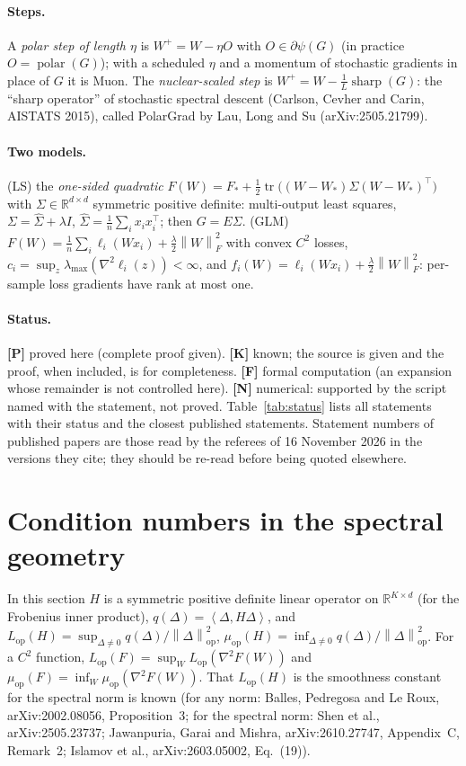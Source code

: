 \documentclass[11pt]{article}
\theoremstyle{definition}
\theoremstyle{remark}
\newcommand{\R}{\mathbb{R}}
\newcommand{\nop}[1]{\left\|#1\right\|_{\mathrm{op}}}
\newcommand{\nF}[1]{\left\|#1\right\|_{F}}
\newcommand{\inner}[2]{\left\langle #1, #2 \right\rangle}
\newcommand{\tr}{\operatorname{tr}}
\newcommand{\polar}{\operatorname{polar}}
\newcommand{\sharpop}{\operatorname{sharp}}
\newcommand{\Lop}{L_{\mathrm{op}}}
\newcommand{\muop}{\mu_{\mathrm{op}}}
\newcommand{\lmax}{\lambda_{\max}}
\begin{document}
\paragraph{Steps.} A \emph{polar step of length $\eta$} is $W^+=W-\eta O$ with $O\in\partial\psi(G)$ (in practice
$O=\polar(G)$); with a scheduled $\eta$ and a momentum of stochastic gradients in place of $G$ it is Muon. The
\emph{nuclear-scaled step} is $W^+=W-\frac{1}{L}\sharpop(G)$: the ``sharp operator'' of stochastic spectral descent
(Carlson, Cevher and Carin, AISTATS 2015), called PolarGrad by Lau, Long and Su (arXiv:2505.21799).

\paragraph{Two models.} (LS) the \emph{one-sided quadratic}
$F(W)=F_\ast+\frac12\tr\big((W-W_\ast)\Sigma(W-W_\ast)^\top\big)$ with $\Sigma\in\R^{d\times d}$ symmetric positive
definite: multi-output least squares, $\Sigma=\hat\Sigma+\lambda I$, $\hat\Sigma=\frac1n\sum_ix_ix_i^\top$; then
$G=E\Sigma$. (GLM) $F(W)=\frac1n\sum_i\ell_i(Wx_i)+\frac\lambda2\nF W^2$ with convex $C^2$ losses,
$c_i=\sup_z\lmax(\nabla^2\ell_i(z))<\infty$, and $f_i(W)=\ell_i(Wx_i)+\frac\lambda2\nF W^2$: per-sample loss gradients
have rank at most one.

\paragraph{Status.} \textbf{[P]} proved here (complete proof given). \textbf{[K]} known; the source is given and the
proof, when included, is for completeness. \textbf{[F]} formal computation (an expansion whose remainder is not
controlled here). \textbf{[N]} numerical: supported by the script named with the statement, not proved.
Table~\ref{tab:status} lists all statements with their status and the closest published statements. Statement numbers of
published papers are those read by the referees of 16 November 2026 in the versions they cite; they should be re-read
before being quoted elsewhere.

\section{Condition numbers in the spectral geometry}\label{sec:kappa}

In this section $H$ is a symmetric positive definite linear operator on $\R^{K\times d}$ (for the Frobenius inner
product), $q(\Delta)=\inner{\Delta}{H\Delta}$, and $\Lop(H)=\sup_{\Delta\ne0}q(\Delta)/\nop\Delta^2$,
$\muop(H)=\inf_{\Delta\ne0}q(\Delta)/\nop\Delta^2$. For a $C^2$ function, $\Lop(F)=\sup_W\Lop(\nabla^2F(W))$ and
$\muop(F)=\inf_W\muop(\nabla^2F(W))$. That $\Lop(H)$ is the smoothness constant for the spectral norm is known (for any
norm: Balles, Pedregosa and Le Roux, arXiv:2002.08056, Proposition~3; for the spectral norm: Shen et al.,
arXiv:2505.23737; Jawanpuria, Garai and Mishra, arXiv:2610.27747, Appendix~C, Remark~2; Islamov et al.,
arXiv:2603.05002, Eq.~(19)).
\end{document}

